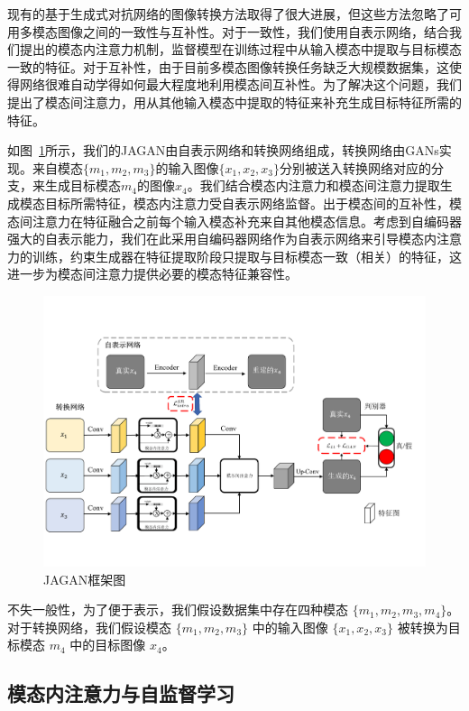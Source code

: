 现有的基于生成式对抗网络的图像转换方法取得了很大进展，但这些方法忽略了可用多模态图像之间的一致性与互补性。对于一致性，我们使用自表示网络，结合我们提出的模态内注意力机制，监督模型在训练过程中从输入模态中提取与目标模态一致的特征。对于互补性，由于目前多模态图像转换任务缺乏大规模数据集，这使得网络很难自动学得如何最大程度地利用模态间互补性。为了解决这个问题，我们提出了模态间注意力，用从其他输入模态中提取的特征来补充生成目标特征所需的特征。

如图~\ref{f1}所示，我们的JAGAN由自表示网络和转换网络组成，转换网络由GANs实现。来自模态$\{m_1, m_2, m_3\}$的输入图像$\{x_1, x_2, x_3\}$分别被送入转换网络对应的分支，来生成目标模态$m_4$的图像$x_4$。我们结合模态内注意力和模态间注意力提取生成模态目标所需特征，模态内注意力受自表示网络监督。出于模态间的互补性，模态间注意力在特征融合之前每个输入模态补充来自其他模态信息。考虑到自编码器强大的自表示能力，我们在此采用自编码器网络作为自表示网络来引导模态内注意力的训练，约束生成器在特征提取阶段只提取与目标模态一致（相关）的特征，这进一步为模态间注意力提供必要的模态特征兼容性。

\begin{figure}
    \centering
    \includegraphics[width=1\columnwidth]{figures/JAGAN/framework.pdf}
    \caption[aaa]{JAGAN框架图}
    \label{f1}
\end{figure}

不失一般性，为了便于表示，我们假设数据集中存在四种模态 $\{m_1, m_2, m_3, m_4\}$。对于转换网络，我们假设模态 $\{m_1, m_2, m_3\}$ 中的输入图像 $\{x_1, x_2, x_3\}$ 被转换为目标模态 $m_4$ 中的目标图像 $x_4$。

\subsection{模态内注意力与自监督学习}

